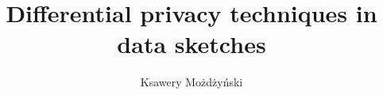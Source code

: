 \documentclass[magister,druk,en]{dyplom}
\author{Ksawery Możdżyński}
\title{Differential privacy techniques in data sketches}
\theoremstyle{plain}
\theoremstyle{definition}
\theoremstyle{remark}
\begin{document}
\maketitle



\tableofcontents













\listoffigures
\listofalgorithms
\listoftables

\appendixpage
\appendix

\end{document}
